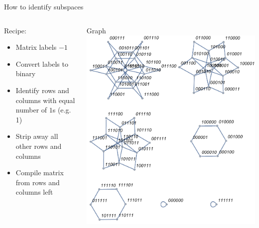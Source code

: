 \documentclass{beamer}
\begin{document}
\begin{frame}{How to identify subspaces}
	\begin{columns}[T]
		\begin{column}{0.5\textwidth}
			\centering
   			Recipe:
   			\begin{itemize}
   				\item Matrix labels $-1$
   				\item Convert labels to binary
   				\item Identify rows and columns with equal number of $1$s (e.g. 1)
   				\item Strip away all other rows and columns
   				\item Compile matrix from rows and columns left
   			\end{itemize}
   		\end{column}
		\begin{column}{0.5\textwidth}
			\centering
    		Graph
    		\includegraphics[trim=0 0 0 0mm, width=\textwidth]{Images/ring6_hamilton_graph3d_alt}
		\end{column}
	\end{columns}
\end{frame}
\end{document}
